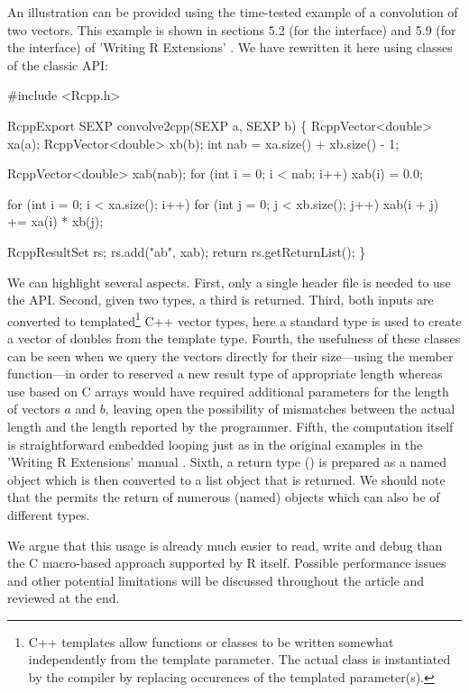 An illustration can be provided using the time-tested example of a
convolution of two vectors. This example is shown in sections 5.2 (for the
 interface) and 5.9 (for the  interface) of 'Writing
R Extensions' \citep{R:exts}. We have rewritten it here using classes of the
classic  API:

\begin{example}
#include <Rcpp.h>

RcppExport SEXP convolve2cpp(SEXP a, SEXP b) \{
  RcppVector<double> xa(a);
  RcppVector<double> xb(b);
  int nab = xa.size() + xb.size() - 1;

  RcppVector<double> xab(nab);
  for (int i = 0; i < nab; i++) xab(i) = 0.0;

  for (int i = 0; i < xa.size(); i++)
    for (int j = 0; j < xb.size(); j++) 
       xab(i + j) += xa(i) * xb(j);

  RcppResultSet rs;
  rs.add("ab", xab);
  return rs.getReturnList();
\}
\end{example}

We can highlight several aspects. First, only a single header file
 is needed to use the  API.  Second, given two
 types, a third is returned.
Third, both inputs are converted to templated\footnote{C++ templates
allow functions or classes to be written somewhat independently from the 
template parameter. The actual class is instantiated by the compiler
by replacing occurences of the templated parameter(s).}
C++ vector types, here a standard 
type is used to create a vector of doubles from the template type.
Fourth, the usefulness of these classes can be seen when we query the
vectors directly for their size---using the  member function---in
order to reserved a new result type of appropriate length whereas use based
on C arrays would have required additional parameters for the length of
vectors $a$ and $b$, leaving open the possibility of mismatches between the
actual length and the length reported by the programmer. 
Fifth, the computation itself is straightforward embedded looping just as in the
original examples in the 'Writing R Extensions' manual \citep{R:exts}.
Sixth, a return type () is prepared as a named
object which is then
converted to a list object that is returned.  We should note that the
 permits the return of numerous (named) objects which can
also be of different types.

We argue that this usage is already much easier to read, write and debug than the
C macro-based approach supported by R itself. Possible performance issues and
other potential limitations will be discussed throughout the article and
reviewed at the end.

